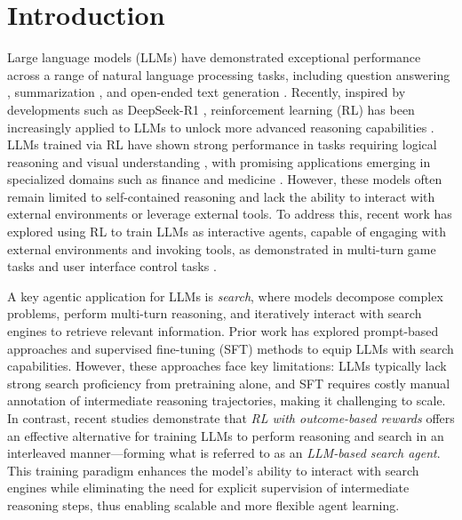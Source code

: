 \section{Introduction}
Large language models (LLMs) \cite{zhao2023survey} have demonstrated exceptional performance across a range of natural language processing tasks, including question answering \cite{liu2024chatqa}, summarization \cite{zhang2024benchmarking}, and open-ended text generation \cite{gomez2023confederacy}.
Recently, inspired by developments such as DeepSeek-R1 \cite{guo2025deepseek}, reinforcement learning (RL) \cite{kaelbling1996reinforcement,sutton1999reinforcement} has been increasingly applied to LLMs to unlock more advanced reasoning capabilities \cite{wei2022chain}.
LLMs trained via RL have shown strong performance in tasks requiring logical reasoning \cite{xie2025logic} and visual understanding \cite{zhan2025vision}, with promising applications emerging in specialized domains such as finance \cite{liu2025fin} and medicine \cite{lai2025med}.
However, these models often remain limited to self-contained reasoning and lack the ability to interact with external environments or leverage external tools.
To address this, recent work has explored using RL to train LLMs as interactive agents, capable of engaging with external environments and invoking tools, as demonstrated in multi-turn game tasks \cite{wang2025ragen} and user interface control tasks \cite{liu2025infigui,xia2025gui}.

A key agentic application for LLMs is \textit{search}, where models decompose complex problems, perform multi-turn reasoning, and iteratively interact with search engines to retrieve relevant information.
Prior work has explored prompt-based approaches \cite{jin2024long,trivedi2022interleaving} and supervised fine-tuning (SFT) methods \cite{asai2023self,schick2023toolformer} to equip LLMs with search capabilities.
However, these approaches face key limitations: LLMs typically lack strong search proficiency from pretraining alone, and SFT requires costly manual annotation of intermediate reasoning trajectories, making it challenging to scale.
In contrast, recent studies \cite{chen2025research,jin2025search,song2025r1,zheng2025deepresearcher} demonstrate that \textit{RL with outcome-based rewards} offers an effective alternative for training LLMs to perform reasoning and search in an interleaved manner---forming what is referred to as an \textit{LLM-based search agent}.
This training paradigm enhances the model’s ability to interact with search engines while eliminating the need for explicit supervision of intermediate reasoning steps, thus enabling scalable and more flexible agent learning.

